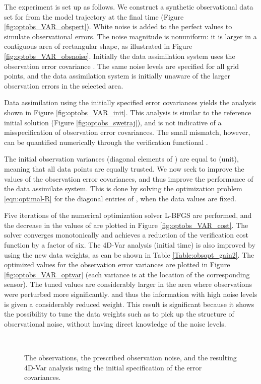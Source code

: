 \documentclass{article}
\begin{document}
The experiment is set up as follows. We construct a synthetic observational data set for 
from the model trajectory at the final time (Figure \ref{fig:optobs_VAR_obspert}).
White noise is added to the perfect values to simulate observational errors. 
The noise magnitude is nonuniform: it is larger in a contiguous area of rectangular shape,
as illustrated in Figure \ref{fig:optobs_VAR_obsnoise}. Initially the data assimilation system uses the observation error 
covariance . The same noise levels are specified for all grid points, and the data assimilation system is initially unaware of the
larger observation errors in the selected area.

Data assimilation using the initially specified error covariances yields the analysis shown in Figure \ref{fig:optobs_VAR_init}.
This analysis is similar to the reference initial solution (Figure \ref{fig:optobs_swetraj}), and is not indicative
of a misspecification of observation error covariances.
The small mismatch, however,  can be quantified numerically through the verification functional .

The initial observation variances (diagonal elements of ) are equal to  (unit), 
meaning that all data points are equally trusted. We now seek to improve the values of the observation error covariances, and thus improve the performance of
the data assimilate system. This is done by solving the optimization 
problem \eqref{eqn:optimal-R} for the diagonal entries of , when the data values  are fixed.

Five iterations of the numerical optimization solver L-BFGS are performed, and the decrease in the values of  
are plotted in Figure \ref{fig:optobs_VAR_cost}.
The solver converges monotonically and achieves a reduction of the verification cost function by a factor of six.
The 4D-Var analysis (initial time) is also improved by using the new data weights, as can be shown in Table \ref{Table:obsopt_gain2}.
The optimized values for the observation error variances are plotted in Figure \ref{fig:optobs_VAR_optvar}
(each variance is at the location of the corresponding sensor).
The tuned values are considerably larger in the area where observations were perturbed more significantly.
and thus the information with high noise levels is given a considerably reduced weight.
This result is significant because it shows the possibility to tune the data weights such as to
pick up the structure of observational noise, without having direct knowledge of the noise levels.


\begin{figure}
\setcounter{subfigure}{0}
\centering
  \\
 \caption{The  observations, the prescribed observation noise, and the resulting 4D-Var analysis using the initial specification of the error covariances.}
\end{figure}
\end{document}
